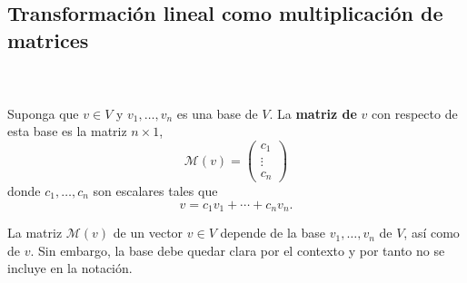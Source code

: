 \subsection{Transformación lineal como multiplicación de matrices}

\begin{mydef}\;\\\\
    Suponga que $v\in V$ y $v_1,\ldots,v_n$ es una base de $V$. La \textbf{matriz de} $v$ con respecto de esta base es la matriz $n\times 1$,
    $$\mathcal{M}(v)=
	\begin{pmatrix}
	    c_1\\
	    \vdots\\
	    c_n
	\end{pmatrix}
    $$
    donde $c_1,\ldots,c_n$ son escalares tales que
    $$v=c_1v_1+\cdots+c_nv_n.$$
\end{mydef}

La matriz $\mathcal{M}(v)$ de un vector $v\in V$ depende de la base $v_1,\ldots,v_n$ de $V$, así como de $v$. Sin embargo, la base debe quedar clara por el contexto y por tanto no se incluye en la notación.
